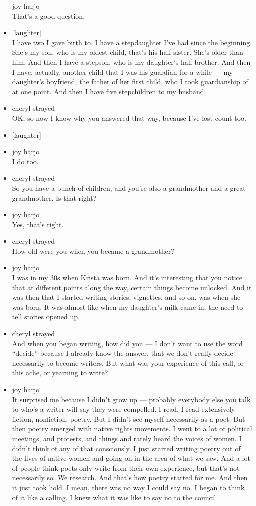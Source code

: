 \begin{itemize}
  joy harjo\\
  That's a good question.
\item
  {[}laughter{]}\\
  I have two I gave birth to. I have a stepdaughter I've had since the
  beginning. She's my son, who is my oldest child, that's his
  half-sister. She's older than him. And then I have a stepson, who is
  my daughter's half-brother. And then I have, actually, another child
  that I was his guardian for a while --- my daughter's boyfriend, the
  father of her first child, who I took guardianship of at one point.
  And then I have five stepchildren to my husband.
\item
  cheryl strayed\\
  OK, so now I know why you answered that way, because I've lost count
  too.
\item
  {[}laughter{]}
\item
  joy harjo\\
  I do too.
\item
  cheryl strayed\\
  So you have a bunch of children, and you're also a grandmother and a
  great-grandmother. Is that right?
\item
  joy harjo\\
  Yes, that's right.
\item
  cheryl strayed\\
  How old were you when you became a grandmother?
\item
  joy harjo\\
  I was in my 30s when Krista was born. And it's interesting that you
  notice that at different points along the way, certain things become
  unlocked. And it was then that I started writing stories, vignettes,
  and so on, was when she was born. It was almost like when my
  daughter's milk came in, the need to tell stories opened up.
\item
  cheryl strayed\\
  And when you began writing, how did you --- I don't want to use the
  word ``decide'' because I already know the answer, that we don't
  really decide necessarily to become writers. But what was your
  experience of this call, or this ache, or yearning to write?
\item
  joy harjo\\
  It surprised me because I didn't grow up --- probably everybody else
  you talk to who's a writer will say they were compelled. I read. I
  read extensively --- fiction, nonfiction, poetry. But I didn't see
  myself necessarily as a poet. But then poetry emerged with native
  rights movements. I went to a lot of political meetings, and protests,
  and things and rarely heard the voices of women. I didn't think of any
  of that consciously. I just started writing poetry out of the lives of
  native women and going on in the area of what we saw. And a lot of
  people think poets only write from their own experience, but that's
  not necessarily so. We research. And that's how poetry started for me.
  And then it just took hold. I mean, there was no way I could say no. I
  began to think of it like a calling. I knew what it was like to say no
  to the council.


\end{itemize}
